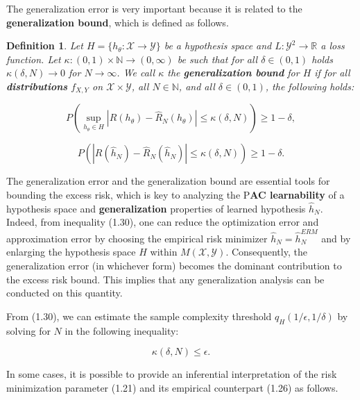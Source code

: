 \documentclass{report}
\newtheorem{definition}{Definition}[chapter]
\begin{document}
The generalization error is very important because it is related to the \textbf{generalization bound}, which is defined as follows.

\begin{definition}
Let $H = \{h_\theta : \mathcal{X} \to \mathcal{Y}\}$ be a hypothesis space and $L:\mathcal{Y}^2 \to \mathbb{R}$ a loss function. Let $\kappa : (0,1) \times \mathbb{N} \to (0,\infty)$ be such that for all $\delta \in (0,1)$ holds $\kappa(\delta, N) \to 0$ for $N \to \infty$. We call $\kappa$ the \textbf{generalization bound} for $H$ if for all \textbf{distributions} $f_{X,Y}$ on $\mathcal{X} \times \mathcal{Y}$, all $N \in \mathbb{N}$, and all $\delta \in (0,1)$, the following holds:

\begin{equation}
P\left(\sup_{h_{\theta} \in H}|R(h_\theta)-\hat{R}_N(h_\theta)|\leq \kappa(\delta, N)\right) \geq 1-\delta,
\end{equation}

\begin{equation}
P\left(|R(\hat{h}_N)-\hat{R}_N(\hat{h}_N)|\leq \kappa(\delta, N)\right) \geq 1-\delta.
\end{equation}
\end{definition}

The generalization error and the generalization bound are essential tools for bounding the excess risk, which is key to analyzing the P\textbf{AC learnability} of a hypothesis space and \textbf{generalization} properties of learned hypothesis $\hat{h}_N$. Indeed, from inequality (1.30), one can reduce the optimization error and approximation error by choosing the empirical risk minimizer $\hat{h}_N = \hat{h}^{ERM}_N$ and by enlarging the hypothesis space $H$ within $M(\mathcal{X}, \mathcal{Y})$. Consequently, the generalization error (in whichever form) becomes the dominant contribution to the excess risk bound. This implies that any generalization analysis can be conducted on this quantity.

From (1.30), we can estimate the sample complexity threshold $q_H(1/\epsilon, 1/\delta)$ by solving for $N$ in the following inequality:

\begin{equation}
\kappa(\delta,N) \leq \epsilon.
\end{equation}

In some cases, it is possible to provide an inferential interpretation of the risk minimization parameter (1.21) and its empirical counterpart (1.26) as follows.
\end{document}
